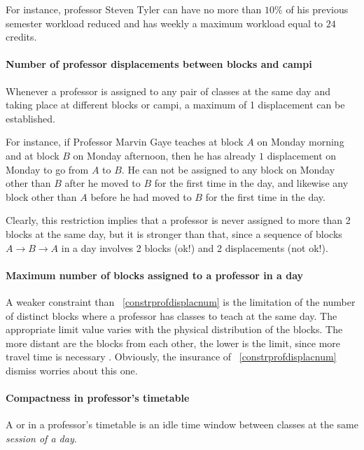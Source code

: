 For instance, professor Steven Tyler can have no more than $10\%$ of his previous semester workload reduced and has weekly a maximum workload equal to $24$ credits.


\paragraph{Number of professor displacements between blocks and campi}
\label{constrprofdisplacnum}

Whenever a professor is assigned to any pair of classes at the same day and taking place at different blocks or campi, a maximum of 1 displacement can be established.

For instance, if Professor Marvin Gaye teaches at block $A$ on Monday morning and at block $B$ on Monday afternoon, then he has already $1$ displacement on Monday to go from $A$ to $B$. He can not be assigned to any block on Monday other than $B$ after he moved to $B$ for the first time in the day, and likewise any block other than $A$ before he had moved to $B$ for the first time in the day.

Clearly, this restriction implies that a professor is never assigned to more than 2 blocks at the same day, but it is stronger than that, since a sequence of blocks $A \rightarrow B \rightarrow A$ in a day involves 2 blocks (ok!) and 2 displacements (not ok!).


\paragraph{Maximum number of blocks assigned to a professor in a day}
\label{constrmaxblockprof}

A weaker constraint than ~\ref{constrprofdisplacnum} is the limitation of the number of distinct blocks where a professor has classes to teach at the same day. The appropriate limit value varies with the physical distribution of the blocks. The more distant are the blocks from each other, the lower is the limit, since more travel time is necessary . Obviously, the insurance of ~\ref{constrprofdisplacnum} dismiss worries about this one.


\paragraph{Compactness in professor's timetable}
\label{constrmingapprof}

A  or  in a professor's timetable is an idle time window between classes at the same \textit{session of a day}.

